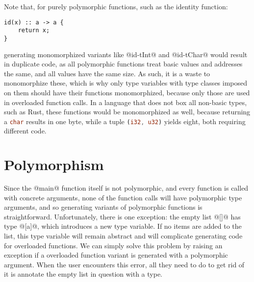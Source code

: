 \begin{enumerate}
    Note that, for purely polymorphic functions, such as the identity function:
\begin{lstlisting}
id(x) :: a -> a {
    return x;
}
\end{lstlisting}
   generating monomorphized variants like @id-tInt@ and @id-tChar@ would result in duplicate code, as all polymorphic functions treat basic values and addresses the same, and all values have the same size. As such, it is a waste to monomorphize these, which is why only type variables with type classes imposed on them should have their functions monomorphized, because only those are used in overloaded function calls. In a language that does not box all non-basic types, such as Rust, these functions would be monomorphized as well, because returning a \lstinline[language=rust]|char| results in one byte, while a tuple \lstinline[language=rust]|(i32, u32)| yields eight, both requiring different code.

    
\end{enumerate}

\section{Polymorphism}
Since the @main@ function itself is not polymorphic, and every function is called with concrete arguments, none of the function calls will have polymorphic type arguments, and so generating variants of polymorphic functions is straightforward. Unfortunately, there is one exception: the empty list @[]@ has type @[a]@, which introduces a new type variable. If no items are added to the list, this type variable will remain abstract and will complicate generating code for overloaded functions. We can simply solve this problem by raising an exception if a overloaded function variant is generated with a polymorphic argument. When the user encounters this error, all they need to do to get rid of it is annotate the empty list in question with a type.

